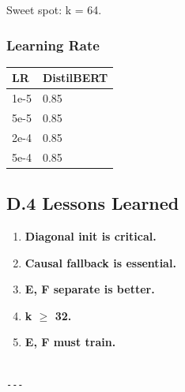 Sweet spot: k = 64.

\subsubsection{Learning Rate}

\begin{table}[H]
\centering
\small
\begin{tabular}{ll}
\toprule
\textbf{LR} & \textbf{DistilBERT} \\
\midrule
1e-5 & 0.85 \\
5e-5 & 0.85 \\
2e-4 & 0.85 \\
5e-4 & 0.85 \\
\bottomrule
\end{tabular}
\end{table}

\subsection{D.4 Lessons Learned}

\begin{enumerate}
\item \textbf{Diagonal init is critical.}
\item \textbf{Causal fallback is essential.}
\item \textbf{E, F separate is better.}
\item \textbf{k $\ge$ 32.}
\item \textbf{E, F must train.}
\end{enumerate}
\begin{lstlisting}

---
\end{lstlisting}